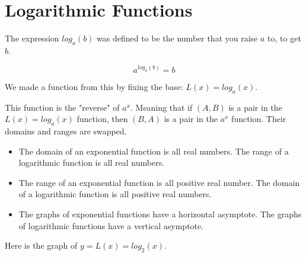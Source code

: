 \documentclass{ximera}
\begin{document}
\section{Logarithmic Functions}

The expression $log_a(b)$ was defined to be the number that you raise $a$ to, to get $b$.

\[   a^{log_a(b)} = b  \]




We made a function from this by fixing the base:  $L(x) = log_a(x)$.


This function is the "reverse" of $a^x$.  Meaning that if $(A, B)$ is a pair in the $L(x) = log_a(x)$ function, then $(B, A)$ is a pair in the $a^x$ function. Their domains and ranges are swapped.


\begin{itemize}

\item The domain of an exponential function is all real numbers. The range of a logarithmic function is all real numbers.  


\item The range of an exponential function is all positive real number. The domain of a logarithmic function is all positive real numbers.

\item The graphs of exponential functions have a horizontal asymptote. The graphs of logarithmic functions have a vertical asymptote. 

\end{itemize}






Here is the graph of $y = L(x) = log_2(x)$.

\begin{image}
\end{image}
\end{document}
